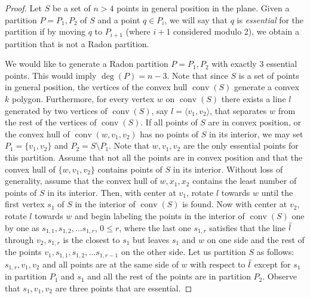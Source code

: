 \documentclass[11pt,a4paper]{article}
\theoremstyle{plain}
\theoremstyle{definition}
\newcommand{\conv}{\operatorname{conv}}
\begin{document}
\begin{proof}
Let $S$ be a set of $n > 4$ points in general position in the plane.  Given a partition $P=P_1,P_2$ of $S$ and a point $q \in P_i$, we will say that $q$ is \emph{essential} for the partition if by moving $q$ to $P_{i+1}$ (where $i+1$ considered modulo 2), we obtain a partition that is not a Radon partition. 

We would like to generate a Radon partition $P= P_1, P_2$ with exactly $3$ essential points.  This would imply $\deg (P)= n- 3$.  
Note that since $S$ is a set of points in general position, the vertices of the convex hull $\conv(S)$ generate a convex $k$ polygon.
Furthermore, for every vertex $w$ on $\conv(S)$ there exists a line $l$ generated by two vertices of $\conv(S)$, say $l=\langle v_1,v_2\rangle$,  that separates $w$ from the rest of the vertices of  $\conv(S)$. 
If all points of $S$ are in convex position, or the convex hull of $\conv(w, v_1,v_2)$ has no points of $S$ in its interior, we may set $P_1=\{v_1,v_2\}$ and $P_2 = S\setminus P_1$. Note that $w, v_1,v_2$ are the only essential points for this partition. 
Assume that not all the points are in convex position and that the convex hull of $\{w, v_1,v_2\}$ contains points of $S$ in its interior. Without loss of generality, assume that the convex hull of $w,x_1,x_2$ contains the least number of points of $S$ in its interior. 
Then, with center at $v_1$, rotate $l$ towards $w$ until the first vertex $s_{1}$ of $S$ in the interior of $\conv(S)$ is found. Now with center at $v_2$, rotate $l$ towards $w$ and begin labeling the points in the interior of $\conv(S)$ one by one as $s_{1,1},s_{1,2},\dots s_{1,r}$, 
$0\leq r$, where the last one $s_{1,r}$ satisfies that the line $\Bar{l}$ through $v_2,s_{1,r}$ is the closest to $s_{1}$ but leaves $s_{1}$ and $w$ on one side and the rest of the points 
$v_1,s_{1,1},s_{1,2},\dots s_{1,r-1}$ on the other side. 
Let us partition $S$ as follows: $s_{1,r},v_1,v_2$ and all points are at the same side of $w$ with respect to $\Bar{l}$ except for $s_{1}$ in partition $P_1$ and $s_{1}$ and all the rest of the points are in partition $P_2$.  Observe that $s_{1},v_1,v_2$ are three points that are essential. %
%

\end{proof}
\end{document}

